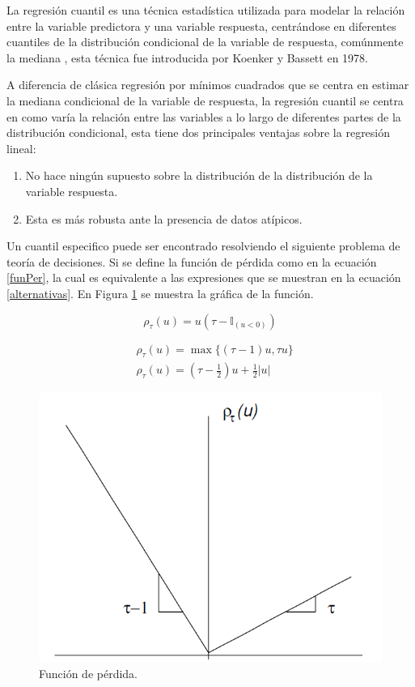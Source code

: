     La regresión cuantil es una técnica estadística utilizada para modelar la relación entre la variable predictora y una variable respuesta, centrándose en diferentes cuantiles de la distribución condicional de la variable de respuesta, comúnmente la mediana \cite{cuantilReg}, esta técnica fue introducida por Koenker y Bassett en 1978.  
    
    A diferencia de clásica regresión por mínimos cuadrados que se centra en estimar la mediana condicional de la variable de respuesta, la regresión cuantil se centra en como varía la relación entre las variables a lo largo de diferentes partes de la distribución condicional, esta tiene dos principales ventajas sobre la regresión lineal:
    
    \begin{enumerate}
        \item No hace ningún supuesto sobre la distribución de la distribución de la variable respuesta.
        \item Esta es más robusta ante la presencia de datos atípicos. 
    \end{enumerate}

    Un cuantil especifico puede ser encontrado resolviendo el siguiente problema de teoría de decisiones. Si se define la función de pérdida como en la ecuación \eqref{funPer}, la cual es equivalente a las expresiones que se muestran en la ecuación \eqref{alternativas}. En Figura \ref{fig:perdida} se muestra la gráfica de la función.
    
    \begin{equation}\label{funPer}
    \rho_\tau(u)= u\left(\tau-\mathbb{I}_{(u<0)}\right)
    \end{equation}

    \begin{equation}\label{alternativas}
    \begin{split}
        &\rho_\tau(u)=\max \{(\tau-1) u, \tau u\}\\
        &\rho_\tau(u)=\left(\tau-\frac{1}{2}\right) u+\frac{1}{2}|u|
    \end{split}
    \end{equation}
    
    \begin{figure}[H]
        \centering
        \includegraphics[width = 0.5 \textwidth]{Imagenes/perdida.png}
        \caption{Función de pérdida.}
        \label{fig:perdida}
    \end{figure}
    
